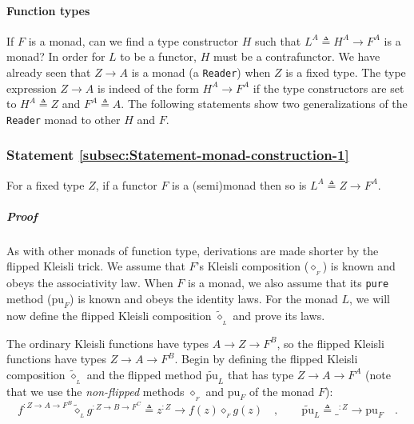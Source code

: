 \paragraph{Function types}

If $F$ is a monad, can we find a type constructor $H$ such that
$L^{A}\triangleq H^{A}\rightarrow F^{A}$ is a monad? In order for
$L$ to be a functor, $H$ must be a contrafunctor. We have already
seen that $Z\rightarrow A$ is a monad (a \lstinline!Reader!) when
$Z$ is a fixed type. The type expression $Z\rightarrow A$ is indeed
of the form $H^{A}\rightarrow F^{A}$ if the type constructors are
set to $H^{A}\triangleq Z$ and $F^{A}\triangleq A$. The following
statements show two generalizations of the \lstinline!Reader! monad
to other $H$ and $F$.

\subsubsection{Statement \label{subsec:Statement-monad-construction-1}\ref{subsec:Statement-monad-construction-1}}

For a fixed type $Z$, if a functor $F$ is a (semi)monad then so
is $L^{A}\triangleq Z\rightarrow F^{A}$.

\subparagraph{Proof}

As with other monads of function type, derivations are made shorter
by the flipped Kleisli trick. We assume that $F$\textsf{'}s Kleisli composition
($\diamond_{_{F}}$) is known and obeys the associativity law. When
$F$ is a monad, we also assume that its \lstinline!pure! method
($\text{pu}_{F}$) is known and obeys the identity laws. For the monad
$L$, we will now define the flipped
Kleisli composition $\tilde{\diamond}_{_{L}}$ and prove its laws.

The ordinary Kleisli functions have types $A\rightarrow Z\rightarrow F^{B}$,
so the flipped Kleisli functions have types $Z\rightarrow A\rightarrow F^{B}$.
Begin by defining the flipped Kleisli composition $\tilde{\diamond}_{_{L}}$
and the flipped method $\tilde{\text{pu}}_{L}$ that has type $Z\rightarrow A\rightarrow F^{A}$
(note that we use the \emph{non-flipped} methods $\diamond_{_{F}}$
and $\text{pu}_{F}$ of the monad $F$):
\[
f^{:Z\rightarrow A\rightarrow F^{B}}\tilde{\diamond}_{_{L}}g^{:Z\rightarrow B\rightarrow F^{C}}\triangleq z^{:Z}\rightarrow f(z)\diamond_{_{F}}g(z)\quad,\quad\quad\tilde{\text{pu}}_{L}\triangleq\_^{:Z}\rightarrow\text{pu}_{F}\quad.
\]

